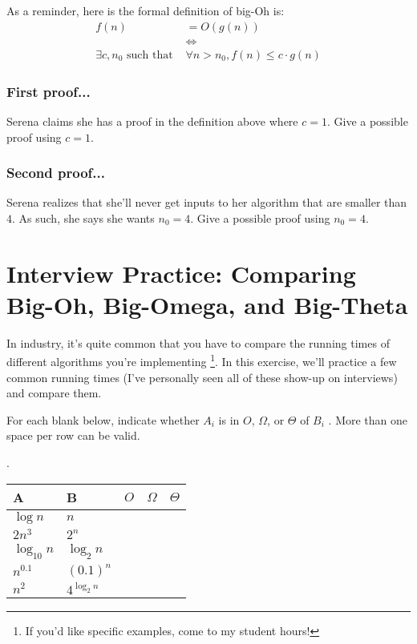 \documentclass [12pt]{article}
\begin{document}
As a reminder, here is the formal definition of big-Oh is:
\begin{align*}
f(n) &= O(g(n)) \\
&\iff \\
\exists c, n_0 \text{ such that } &\forall n > n_0, f(n) \leq c \cdot g(n)
\end{align*}


\subsubsection{First proof...}
 Serena claims she has a proof in the definition above where $c = 1$. Give a possible proof using $c=1$.

\subsubsection{Second proof...}
 Serena realizes that she'll never get inputs to her algorithm that are smaller than $4$. As such, she says she wants $n_0 = 4$. Give a possible proof using $n_0 = 4$.



\pagebreak
\section{Interview Practice: Comparing Big-Oh, Big-Omega, and Big-Theta}
 In industry, it's quite common that you have to compare the running times of different algorithms you're implementing {\footnote{If you'd like specific examples, come to my student hours!}}. In this exercise, we'll practice a few common running times (I've personally seen all of these show-up on interviews) and compare them.

For each blank below, indicate whether $A_i$ is in $O$, $\Omega$, or $\Theta$ of $B_i$
. More than one space per row can be valid.

.

\begin{table}[h!]
\centering
\begin{tabular}{|l|l|l|l|l|}
\hline
\textbf{A} & \textbf{B} & $O$ & $\Omega$ & $\Theta$ \\ \hline
    $\log n$       &      $n$      &  &  &  \\ \hline
     $2n^3$      &  $2^n$         &  &  &  \\ \hline
       $\log_{10} n$    &  $\log_2 n$          &  &  &  \\ \hline
    $n^{0.1}$    &  $(0.1)^n$          &  &  &  \\ \hline
    $n^2$    &  $4^{\log_2 n}$          &  &  &  \\ \hline
\end{tabular}
\end{table}
\end{document}
